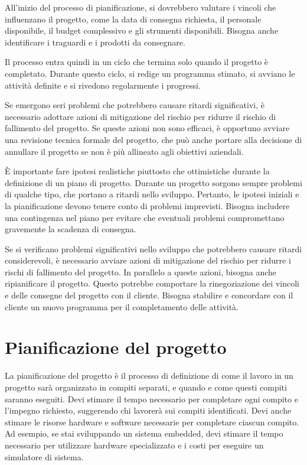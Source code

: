 All'inizio del processo di pianificazione, si dovrebbero valutare i vincoli che influenzano il progetto, come la data di consegna richiesta, il personale disponibile, il budget complessivo e gli strumenti disponibili. Bisogna anche identificare i traguardi e i prodotti da consegnare.

Il processo entra quindi in un ciclo che termina solo quando il progetto è completato. Durante questo ciclo, si redige un programma stimato, si avviano le attività definite e si rivedono regolarmente i progressi.

Se emergono seri problemi che potrebbero causare ritardi significativi, è necessario adottare azioni di mitigazione del rischio per ridurre il rischio di fallimento del progetto. Se queste azioni non sono efficaci, è opportuno avviare una revisione tecnica formale del progetto, che può anche portare alla decisione di annullare il progetto se non è più allineato agli obiettivi aziendali.

È importante fare ipotesi realistiche piuttosto che ottimistiche durante la definizione di un piano di progetto. Durante un progetto sorgono sempre problemi di qualche tipo, che portano a ritardi nello sviluppo. Pertanto, le ipotesi iniziali e la pianificazione devono tenere conto di problemi imprevisti. Bisogna includere una contingenza nel piano per evitare che eventuali problemi compromettano gravemente la scadenza di consegna. 

Se si verificano problemi significativi nello sviluppo che potrebbero causare ritardi considerevoli, è necessario avviare azioni di mitigazione del rischio per ridurre i rischi di fallimento del progetto. In parallelo a queste azioni, bisogna anche ripianificare il progetto.
Questo potrebbe comportare la rinegoziazione dei vincoli e delle consegne del progetto con il cliente. Bisogna stabilire e concordare con il cliente un nuovo programma per il completamento delle attività.

\section{Pianificazione del progetto}
La pianificazione del progetto è il processo di definizione di come il lavoro in un progetto sarà organizzato in compiti separati, e quando e come questi compiti saranno eseguiti. Devi stimare il tempo necessario per completare ogni compito e l'impegno richiesto, suggerendo chi lavorerà sui compiti identificati. Devi anche stimare le risorse hardware e software necessarie per completare ciascun compito. Ad esempio, se stai sviluppando un sistema embedded, devi stimare il tempo necessario per utilizzare hardware specializzato e i costi per eseguire un simulatore di sistema. 

